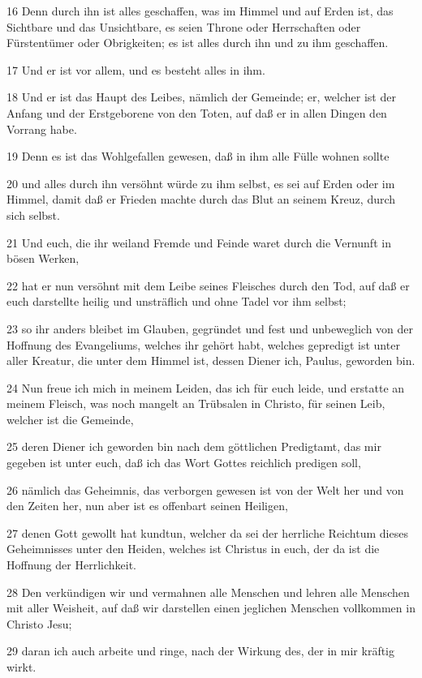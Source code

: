 \par 16 Denn durch ihn ist alles geschaffen, was im Himmel und auf Erden ist, das Sichtbare und das Unsichtbare, es seien Throne oder Herrschaften oder Fürstentümer oder Obrigkeiten; es ist alles durch ihn und zu ihm geschaffen.
\par 17 Und er ist vor allem, und es besteht alles in ihm.
\par 18 Und er ist das Haupt des Leibes, nämlich der Gemeinde; er, welcher ist der Anfang und der Erstgeborene von den Toten, auf daß er in allen Dingen den Vorrang habe.
\par 19 Denn es ist das Wohlgefallen gewesen, daß in ihm alle Fülle wohnen sollte
\par 20 und alles durch ihn versöhnt würde zu ihm selbst, es sei auf Erden oder im Himmel, damit daß er Frieden machte durch das Blut an seinem Kreuz, durch sich selbst.
\par 21 Und euch, die ihr weiland Fremde und Feinde waret durch die Vernunft in bösen Werken,
\par 22 hat er nun versöhnt mit dem Leibe seines Fleisches durch den Tod, auf daß er euch darstellte heilig und unsträflich und ohne Tadel vor ihm selbst;
\par 23 so ihr anders bleibet im Glauben, gegründet und fest und unbeweglich von der Hoffnung des Evangeliums, welches ihr gehört habt, welches gepredigt ist unter aller Kreatur, die unter dem Himmel ist, dessen Diener ich, Paulus, geworden bin.
\par 24 Nun freue ich mich in meinem Leiden, das ich für euch leide, und erstatte an meinem Fleisch, was noch mangelt an Trübsalen in Christo, für seinen Leib, welcher ist die Gemeinde,
\par 25 deren Diener ich geworden bin nach dem göttlichen Predigtamt, das mir gegeben ist unter euch, daß ich das Wort Gottes reichlich predigen soll,
\par 26 nämlich das Geheimnis, das verborgen gewesen ist von der Welt her und von den Zeiten her, nun aber ist es offenbart seinen Heiligen,
\par 27 denen Gott gewollt hat kundtun, welcher da sei der herrliche Reichtum dieses Geheimnisses unter den Heiden, welches ist Christus in euch, der da ist die Hoffnung der Herrlichkeit.
\par 28 Den verkündigen wir und vermahnen alle Menschen und lehren alle Menschen mit aller Weisheit, auf daß wir darstellen einen jeglichen Menschen vollkommen in Christo Jesu;
\par 29 daran ich auch arbeite und ringe, nach der Wirkung des, der in mir kräftig wirkt.

